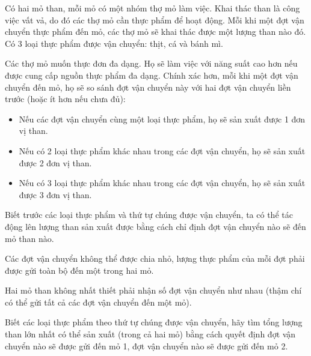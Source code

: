 Có hai mỏ than, mỗi mỏ có một nhóm thợ mỏ làm việc. Khai thác than là công việc vất vả, do đó các thợ mỏ cần thực phẩm để hoạt động. Mỗi khi một đợt vận chuyển thực phẩm đến mỏ, các thợ mỏ sẽ khai thác được một lượng than nào đó. Có 3 loại thực phẩm được vận chuyển: thịt, cá và bánh mì.  

   Các thợ mỏ muốn thực đơn đa dạng. Họ sẽ làm việc với năng suất cao hơn nếu được cung cấp nguồn thực phẩm đa dạng. Chính xác hơn, mỗi khi một đợt vận chuyển đến mỏ, họ sẽ so sánh đợt vận chuyển này với hai đợt vận chuyển liền trước (hoặc ít hơn nếu chưa đủ):  
\begin{itemize}
	\item     Nếu các đợt vận chuyển cùng một loại thực phẩm, họ sẽ sản xuất được 1 đơn vị than.   
	\item     Nếu có 2 loại thực phẩm khác nhau trong các đợt vận chuyển, họ sẽ sản xuất được 2 đơn vị than.   
	\item     Nếu có 3 loại thực phẩm khác nhau trong các đợt vận chuyển, họ sẽ sản xuất được 3 đơn vị than.   
\end{itemize}

   Biết trước các loại thực phẩm và thứ tự chúng được vận chuyển, ta có thể tác động lên lượng than sản xuất được bằng cách chỉ định đợt vận chuyển nào sẽ đến mỏ than nào.  

   Các đợt vận chuyển không thể được chia nhỏ, lượng thực phẩm của mỗi đợt phải được gửi toàn bộ đến một trong hai mỏ.  

   Hai mỏ than không nhất thiết phải nhận số đợt vận chuyển như nhau (thậm chí có thể gửi tất cả các đợt vận chuyển đến một mỏ).  

   Biết các loại thực phẩm theo thứ tự chúng được vận chuyển, hãy tìm tổng lượng than lớn nhất có thể sản xuất (trong cả hai mỏ) bằng cách quyết định đợt vận chuyển nào sẽ được gửi đến mỏ 1, đợt vận chuyển nào sẽ được gửi đến mỏ 2.